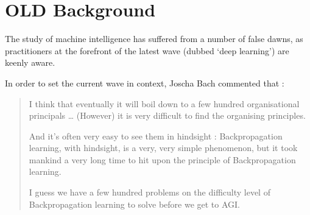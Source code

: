 \documentclass[citeauthoryear]{llncs}
\begin{document}
\begin{thebibliography}{}
%
%
% 
%

\end{thebibliography}

\newpage

\section{OLD Background}
The study of machine intelligence has suffered from a number of false dawns, 
as practitioners at the forefront of the latest wave (dubbed `deep learning') 
are keenly aware.  
%

In order to set the current wave in context, Joscha Bach \cite{Joscha-Bach-2012-interview}
commented that :

\begin{quotation}

I think that eventually it will boil down to a few hundred organisational principals
\dots
%
%
%
(However) it is very difficult to find the organising principles.

And it's often very easy to see them in hindsight : 
Backpropagation learning, with hindsight, is a very, very simple phenomenon, 
but it took mankind a very long time to hit upon the principle of Backpropagation learning. 

I guess we have a few hundred problems on the difficulty level of Backpropagation learning to solve before we get to AGI. 


\end{quotation}
\end{document}
